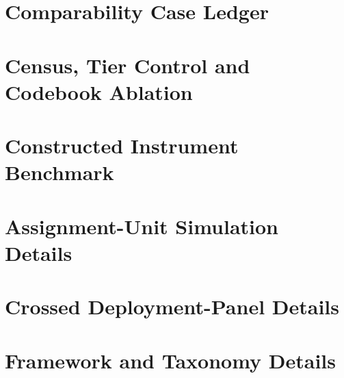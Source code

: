 \documentclass[11pt]{article}
\begin{document}
\clearpage


\clearpage
\appendix



\FloatBarrier
\section{Comparability Case Ledger}
\label{sec:appendix-cases}





\FloatBarrier
\section{Census, Tier Control and Codebook Ablation}
\label{sec:appendix-census}



\FloatBarrier
\section{Constructed Instrument Benchmark}
\label{sec:appendix-instrument}


\FloatBarrier


\FloatBarrier
\section{Assignment-Unit Simulation Details}








\FloatBarrier
\section{Crossed Deployment-Panel Details}
\label{sec:appendix-cmj}



\FloatBarrier
\section{Framework and Taxonomy Details}






\end{document}
